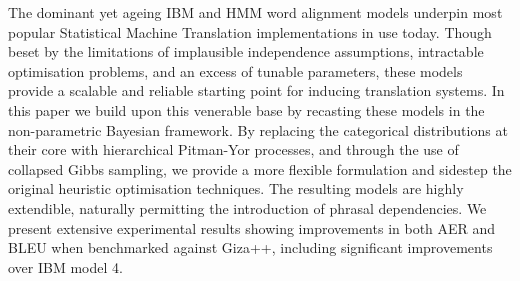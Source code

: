 The dominant yet ageing IBM and HMM word alignment models underpin most
 popular Statistical Machine Translation
 implementations in use today. Though
 beset by the limitations of implausible
 independence assumptions, intractable
 optimisation problems, and an excess of
 tunable parameters, these models provide
 a scalable and reliable starting point for
 inducing translation systems. In this paper we
 build upon this venerable base by recasting
 these models in the non-parametric Bayesian
 framework. By replacing the categorical
 distributions at their core with hierarchical
 Pitman-Yor processes, and through the use
 of collapsed Gibbs sampling, we provide a
 more flexible formulation and sidestep the
 original heuristic optimisation techniques.
 The resulting models are highly extendible,
 naturally permitting the introduction of
 phrasal dependencies. We present extensive
 experimental results showing improvements
 in both AER and BLEU when benchmarked
 against Giza++, including significant
 improvements over IBM model 4.

